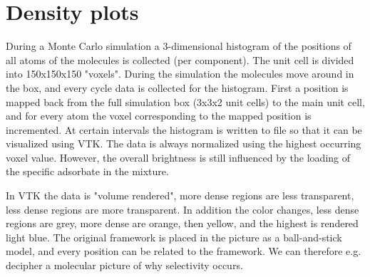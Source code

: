 \begin{figure}[t]
  \centering
  \hskip -0.5cm
  \hskip -0.5cm
  \caption{}
  \label{Fig: ERI picture all}
\end{figure}

\section{Density plots}

During a Monte Carlo simulation a 3-dimensional histogram of the positions
of all atoms of the molecules is collected (per component). The unit cell is divided into 150x150x150 "voxels".
During the simulation the molecules move around in the box, and every cycle data is collected
for the histogram. First a position is mapped back from the full simulation box (3x3x2 unit cells)
to the main unit cell, and for every atom the voxel corresponding to the mapped position is incremented.
At certain intervals the histogram is written to file so that it can be visualized using VTK.
The data is always normalized using the highest occurring voxel value. However, the overall brightness
is still influenced by the loading of the specific adsorbate in the mixture.

In VTK the data is "volume rendered", more dense regions are less transparent, less dense regions are
more transparent. In addition the color changes, less dense regions are grey, more dense are orange,
then yellow, and the highest is rendered light blue. The original framework is placed in the picture as
a ball-and-stick model, and every position can be related to the framework.
We can therefore e.g. decipher a molecular picture of why selectivity occurs.

